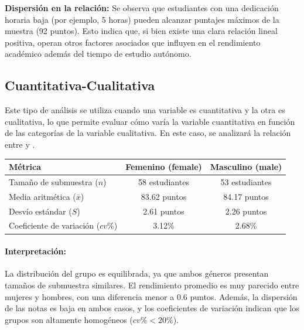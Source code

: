 \textbf{Dispersión en la relación:} Se observa que estudiantes con una dedicación horaria baja (por ejemplo, 5 horas) pueden alcanzar puntajes máximos de la muestra (92 puntos). Esto indica que, si bien existe una clara relación lineal positiva, operan otros factores asociados que influyen en el rendimiento académico además del tiempo de estudio autónomo.
\subsection{Cuantitativa-Cualitativa}
Este tipo de análisis se utiliza cuando una variable es cuantitativa y la otra es cualitativa, lo que permite evaluar cómo varía la variable cuantitativa en función de las categorías de la variable cualitativa. En este caso, se analizará la relación entre  y .





\begin{table}[H]
\centering
{}
\vspace{3pt}
\begin{tabular}{lcc}
\toprule
\textbf{Métrica} & \textbf{Femenino (female)} & \textbf{Masculino (male)} \\
\midrule
Tamaño de submuestra ($n$) & 58 estudiantes & 53 estudiantes \\
Media aritmética ($\bar{x}$) & 83.62 puntos & 84.17 puntos \\
Desvío estándar ($S$) & 2.61 puntos & 2.26 puntos \\
Coeficiente de variación ($cv\%$) & 3.12\% & 2.68\% \\
\bottomrule
\end{tabular}
\end{table}

\paragraph{Interpretación:} La distribución del grupo es equilibrada, ya que ambos géneros presentan tamaños de submuestra similares. El rendimiento promedio es muy parecido entre mujeres y hombres, con una diferencia menor a 0.6 puntos. Además, la dispersión de las notas es baja en ambos casos, y los coeficientes de variación indican que los grupos son altamente homogéneos ($cv\% < 20\%$).

